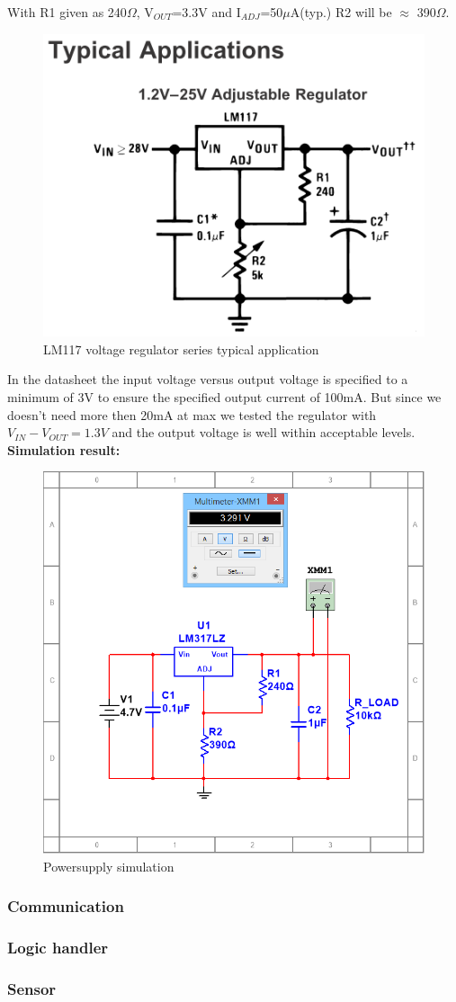 With R1 given as 240$\Omega$, V$_{OUT}$=3.3V and I$_{ADJ}$=50$\mu$A(typ.) R2 will be $\approx$ 390$\Omega$.


\begin{figure}[H]
	\centering
	\includegraphics[width=.5\textwidth]{billeder/LM317}
	\caption{LM117 voltage regulator series typical application}
	\label{fig:LM317}
\end{figure}

In the datasheet the input voltage versus output voltage is specified to a minimum of 3V to ensure the specified output current of 100mA. But since we doesn't need more then 20mA at max we tested the regulator with $V_{IN}-V_{OUT}=1.3V$ and the output voltage is well within acceptable levels.\\

\textbf{Simulation result:}\\

\begin{figure}[H]
	\centering
	\includegraphics[width=.5\textwidth]{billeder/PS_lm317_sim}
	\caption{Powersupply simulation}
	\label{fig:ps_sim}
\end{figure}



\subsubsection{Communication}

\subsubsection{Logic handler}

\subsubsection{Sensor}









